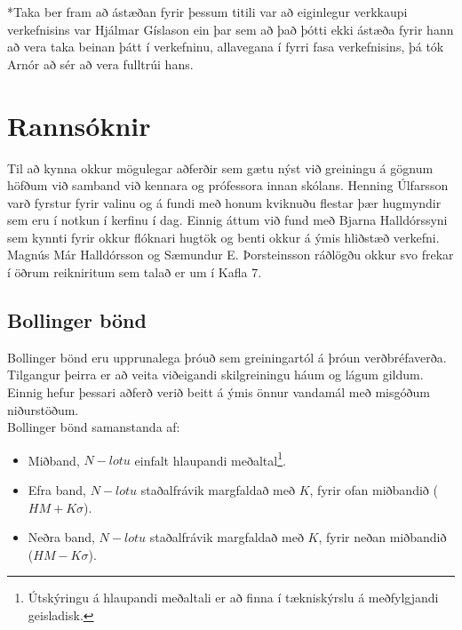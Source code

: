 \documentclass{article}
\begin{document}
*Taka ber fram að ástæðan fyrir þessum titili var að eiginlegur verkkaupi
verkefnisins var Hjálmar Gíslason ein þar sem að það þótti ekki ástæða fyrir
hann að vera taka beinan þátt í verkefninu, allavegana í fyrri fasa
verkefnisins, þá tók Arnór að sér að vera fulltrúi hans.



\newpage


\section{Rannsóknir}
\label{sec:research}
Til að kynna okkur mögulegar aðferðir sem gætu nýst við greiningu á gögnum
höfðum við samband við kennara og prófessora innan skólans. Henning Úlfarsson
varð fyrstur fyrir valinu og á fundi með honum kviknuðu flestar þær hugmyndir sem eru
í notkun í kerfinu í dag. Einnig áttum við fund með Bjarna Halldórssyni sem
kynnti fyrir okkur flóknari hugtök og benti okkur á ýmis hliðstæð verkefni.
Magnús Már Halldórsson og Sæmundur E. Þorsteinsson ráðlögðu okkur svo frekar í
öðrum reikniritum sem talað er um í Kafla 7.



\subsection{Bollinger bönd}
\label{sec:research_bollinger_bands}

Bollinger bönd eru upprunalega þróuð sem greiningartól
á þróun verðbréfaverða. 
Tilgangur þeirra er að veita viðeigandi skilgreiningu háum og lágum gildum.
Einnig hefur þessari 
aðferð verið beitt á ýmis önnur vandamál með misgóðum niðurstöðum. \\

Bollinger bönd samanstanda af:




\begin{itemize}
  \item Miðband, $N-lotu$ einfalt hlaupandi meðaltal\footnote[1]{Útskýringu á
hlaupandi meðaltali er að finna í tækniskýrslu á meðfylgjandi geisladisk.}.
  \item Efra band, $N-lotu$ staðalfrávik margfaldað með $K$, fyrir ofan
miðbandið ($HM + K\sigma$).
  \item Neðra band, $N-lotu$ staðalfrávik margfaldað með $K$, fyrir neðan
miðbandið ($HM -K\sigma$).
\end{itemize}
\end{document}
